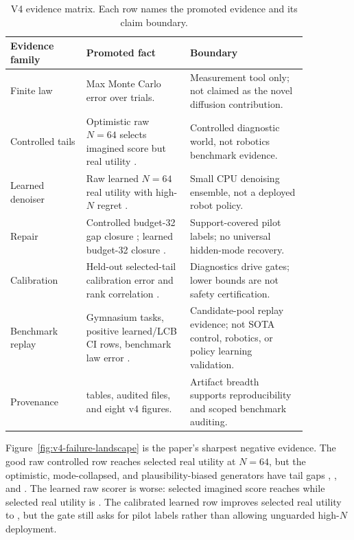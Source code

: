 \documentclass{article}
\begin{document}
\begin{table}[t]
\centering
\small
\caption{V4 evidence matrix. Each row names the promoted evidence and its
claim boundary.}
\label{tab:v4-evidence-matrix}
\begin{tabular}{p{0.22\linewidth}p{0.30\linewidth}p{0.34\linewidth}}
\toprule
Evidence family & Promoted fact & Boundary \\
\midrule
Finite law &
Max Monte Carlo error \VFourDWMExactLawMaxError{} over
\VFourDWMLawTrials{} trials. &
Measurement tool only; not claimed as the novel diffusion contribution. \\
Controlled tails &
Optimistic raw $N=64$ selects imagined score
\VFourDWMOptimisticImagined{} but real utility \VFourDWMOptimisticReal{}. &
Controlled diagnostic world, not robotics benchmark evidence. \\
Learned denoiser &
Raw learned $N=64$ real utility \VFourDWMLearnedRawReal{} with
high-$N$ regret \VFourDWMLearnedRawRegret{}. &
Small CPU denoising ensemble, not a deployed robot policy. \\
Repair &
Controlled budget-32 gap closure \VFourDWMControlledGapBThirtyTwo{};
learned budget-32 closure \VFourDWMLearnedGapBThirtyTwo{}. &
Support-covered pilot labels; no universal hidden-mode recovery. \\
Calibration &
Held-out selected-tail calibration error
\VFourDWMLearnedTailCalibrationError{} and rank correlation
\VFourDWMLearnedHeldoutRankCorr{}. &
Diagnostics drive gates; lower bounds are not safety certification. \\
Benchmark replay &
\VFourDWMBenchmarkEnvs{} Gymnasium tasks,
\VFourDWMBenchmarkPositiveCIRows{} positive learned/LCB CI rows, benchmark
law error \VFourDWMBenchmarkLawMaxError{}. &
Candidate-pool replay evidence; not SOTA control, robotics, or policy
learning validation. \\
Provenance &
\VFourDWMResultTables{} tables, \VFourDWMArtifactFiles{} audited files, and
eight v4 figures. &
Artifact breadth supports reproducibility and scoped benchmark auditing. \\
\bottomrule
\end{tabular}
\end{table}

Figure~\ref{fig:v4-failure-landscape} is the paper's sharpest negative
evidence. The good raw controlled row reaches selected real utility
\VFourDWMGoodRawReal{} at $N=64$, but the optimistic, mode-collapsed, and
plausibility-biased generators have tail gaps
\VFourDWMOptimisticTailGap{}, \VFourDWMModeCollapsedTailGap{}, and
\VFourDWMPlausibilityTailGap{}. The learned raw scorer is worse: selected
imagined score reaches \VFourDWMLearnedRawImagined{} while selected real
utility is \VFourDWMLearnedRawReal{}. The calibrated learned row improves
selected real utility to \VFourDWMLearnedCalReal{}, but the gate still asks
for pilot labels rather than allowing unguarded high-$N$ deployment.
\end{document}
